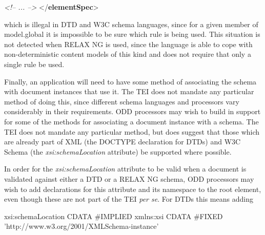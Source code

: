 \begin{shaded}
\hspace*{1em}\mbox{}\newline 
{}\mbox{}\newline 
\textit{<!-- ... -->}\mbox{}\newline 
{</\textbf{elementSpec}>}\end{shaded}\egroup\par \noindent  which is illegal in DTD and W3C schema languages, since for a given member of \textsf{model.global} it is impossible to be sure which rule is being used. This situation is not detected when RELAX NG is used, since the language is able to cope with non-deterministic content models of this kind and does not require that only a single rule be used.\par
Finally, an application will need to have some method of associating the schema with document instances that use it. The TEI does not mandate any particular method of doing this, since different schema languages and processors vary considerably in their requirements. ODD processors may wish to build in support for some of the methods for associating a document instance with a schema. The TEI does not mandate any particular method, but does suggest that those which are already part of XML (the DOCTYPE declaration for DTDs) and W3C Schema (the {\itshape xsi:schemaLocation} attribute) be supported where possible.\par
In order for the {\itshape xsi:schemaLocation} attribute to be valid when a document is validated against either a DTD or a RELAX NG schema, ODD processors may wish to add declarations for this attribute and its namespace to the root element, even though these are not part of the TEI \textit{per se}. For DTDs this means adding \par\hfill\bgroup\exampleFont\vskip 10pt\begin{shaded}
\obeyspaces xsi:schemaLocation CDATA \#IMPLIED xmlns:xsi CDATA \#FIXED 'http://www.w3.org/2001/XMLSchema-instance'\end{shaded}
